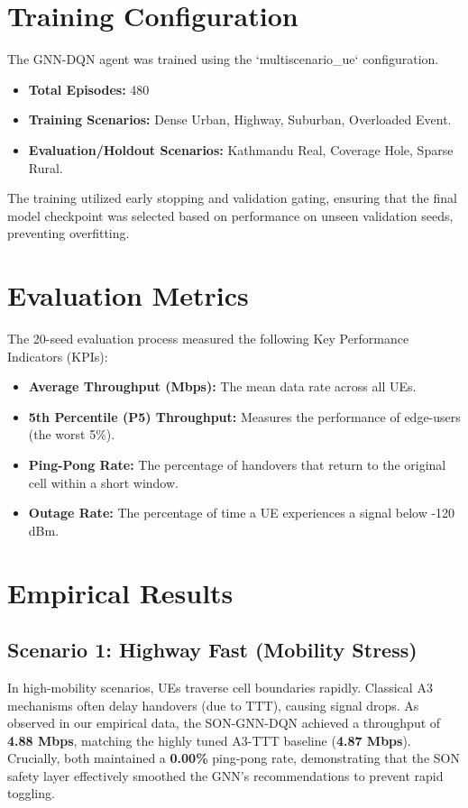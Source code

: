 \documentclass[12pt,a4paper,oneside]{report}
\begin{document}
\section{Training Configuration}
The GNN-DQN agent was trained using the `multiscenario_ue` configuration. 
\begin{itemize}
    \item \textbf{Total Episodes:} 480
    \item \textbf{Training Scenarios:} Dense Urban, Highway, Suburban, Overloaded Event.
    \item \textbf{Evaluation/Holdout Scenarios:} Kathmandu Real, Coverage Hole, Sparse Rural.
\end{itemize}
The training utilized early stopping and validation gating, ensuring that the final model checkpoint was selected based on performance on unseen validation seeds, preventing overfitting.

\section{Evaluation Metrics}
The 20-seed evaluation process measured the following Key Performance Indicators (KPIs):
\begin{itemize}
    \item \textbf{Average Throughput (Mbps):} The mean data rate across all UEs.
    \item \textbf{5th Percentile (P5) Throughput:} Measures the performance of edge-users (the worst 5\%).
    \item \textbf{Ping-Pong Rate:} The percentage of handovers that return to the original cell within a short window.
    \item \textbf{Outage Rate:} The percentage of time a UE experiences a signal below -120 dBm.
\end{itemize}

\section{Empirical Results}

\subsection{Scenario 1: Highway Fast (Mobility Stress)}
In high-mobility scenarios, UEs traverse cell boundaries rapidly. Classical A3 mechanisms often delay handovers (due to TTT), causing signal drops.
As observed in our empirical data, the SON-GNN-DQN achieved a throughput of \textbf{4.88 Mbps}, matching the highly tuned A3-TTT baseline (\textbf{4.87 Mbps}). Crucially, both maintained a \textbf{0.00\%} ping-pong rate, demonstrating that the SON safety layer effectively smoothed the GNN's recommendations to prevent rapid toggling.
\end{document}
